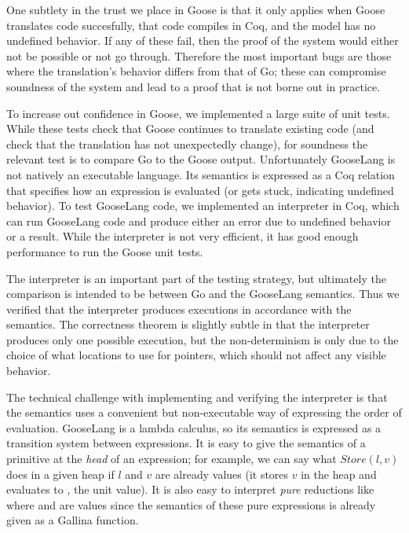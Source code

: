 One subtlety in the trust we place in Goose is that it only applies when
Goose translates code succesfully, that code compiles in Coq, and the
model has no undefined behavior. If any of these fail, then the proof of
the system would either not be possible or not go through. Therefore the
most important bugs are those where the translation's behavior differs
from that of Go; these can compromise soundness of the system and lead
to a proof that is not borne out in practice.

To increase out confidence in Goose, we implemented a large suite of
unit tests. While these tests check that Goose continues to translate
existing code (and check that the translation has not unexpectedly
change), for soundness the relevant test is to compare Go to the Goose
output. Unfortunately GooseLang is not natively an executable language.
Its semantics is expressed as a Coq relation that specifies how an
expression is evaluated (or gets stuck, indicating undefined behavior).
To test GooseLang code, we implemented an interpreter in Coq, which can
run GooseLang code and produce either an error due to undefined behavior
or a result. While the interpreter is not very efficient, it has good
enough performance to run the Goose unit tests.

The interpreter is an important part of the testing strategy, but
ultimately the comparison is intended to be between Go and the GooseLang
semantics. Thus we verified that the interpreter produces executions in
accordance with the semantics. The correctness theorem is slightly
subtle in that the interpreter produces only one possible execution, but
the non-determinism is only due to the choice of what locations to use
for pointers, which should not affect any visible behavior.

The technical challenge with implementing and verifying the interpreter
is that the semantics uses a convenient but non-executable way of
expressing the order of evaluation. GooseLang is a lambda calculus, so
its semantics is expressed as a transition system between expressions.
It is easy to give the semantics of a primitive at the \emph{head} of an
expression; for example, we can say what $Store(l, v)$ does in a given
heap if $l$ and $v$ are already values (it stores $v$ in the heap
and evaluates to \cc{\#()}, the unit value). It is also easy to
interpret \emph{pure} reductions like  where 
and  are values since the semantics of these pure expressions
is already given as a Gallina function.

